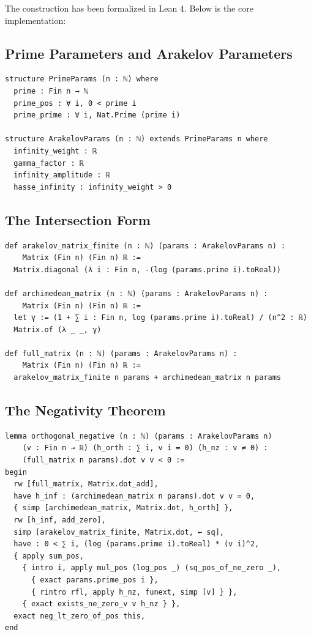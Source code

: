\documentclass[11pt,a4paper]{article}
\begin{document}
The construction has been formalized in Lean 4. Below is the core implementation:

\subsection{Prime Parameters and Arakelov Parameters}

\begin{lstlisting}[language=Lean, basicstyle=\small\ttfamily, keywordstyle=\color{blue}, commentstyle=\color{green}]
structure PrimeParams (n : ℕ) where
  prime : Fin n → ℕ
  prime_pos : ∀ i, 0 < prime i
  prime_prime : ∀ i, Nat.Prime (prime i)

structure ArakelovParams (n : ℕ) extends PrimeParams n where
  infinity_weight : ℝ
  gamma_factor : ℝ
  infinity_amplitude : ℝ
  hasse_infinity : infinity_weight > 0
\end{lstlisting}

\subsection{The Intersection Form}

\begin{lstlisting}[language=Lean, basicstyle=\small\ttfamily, keywordstyle=\color{blue}, commentstyle=\color{green}]
def arakelov_matrix_finite (n : ℕ) (params : ArakelovParams n) : 
    Matrix (Fin n) (Fin n) ℝ :=
  Matrix.diagonal (λ i : Fin n, -(log (params.prime i).toReal))

def archimedean_matrix (n : ℕ) (params : ArakelovParams n) : 
    Matrix (Fin n) (Fin n) ℝ :=
  let γ := (1 + ∑ i : Fin n, log (params.prime i).toReal) / (n^2 : ℝ)
  Matrix.of (λ _ _, γ)

def full_matrix (n : ℕ) (params : ArakelovParams n) : 
    Matrix (Fin n) (Fin n) ℝ :=
  arakelov_matrix_finite n params + archimedean_matrix n params
\end{lstlisting}

\subsection{The Negativity Theorem}

\begin{lstlisting}[language=Lean, basicstyle=\small\ttfamily, keywordstyle=\color{blue}, commentstyle=\color{green}]
lemma orthogonal_negative (n : ℕ) (params : ArakelovParams n)
    (v : Fin n → ℝ) (h_orth : ∑ i, v i = 0) (h_nz : v ≠ 0) :
    (full_matrix n params).dot v v < 0 :=
begin
  rw [full_matrix, Matrix.dot_add],
  have h_inf : (archimedean_matrix n params).dot v v = 0,
  { simp [archimedean_matrix, Matrix.dot, h_orth] },
  rw [h_inf, add_zero],
  simp [arakelov_matrix_finite, Matrix.dot, ← sq],
  have : 0 < ∑ i, (log (params.prime i).toReal) * (v i)^2,
  { apply sum_pos,
    { intro i, apply mul_pos (log_pos _) (sq_pos_of_ne_zero _),
      { exact params.prime_pos i },
      { rintro rfl, apply h_nz, funext, simp [v] } },
    { exact exists_ne_zero_v v h_nz } },
  exact neg_lt_zero_of_pos this,
end
\end{lstlisting}
\end{document}
